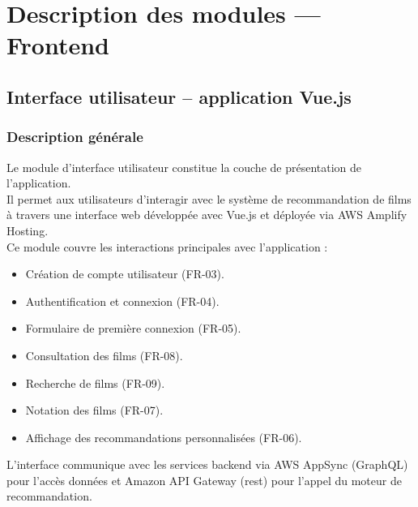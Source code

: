 \documentclass[a4paper,12pt]{report}
\begin{document}
\section{Description des modules — Frontend}

\subsection{Interface utilisateur – application Vue.js}
\label{vue}
\subsubsection{Description générale}
Le module d’interface utilisateur constitue la couche de présentation de l’application.\\ Il permet aux utilisateurs d’interagir avec le système de recommandation de films à travers une interface web développée avec Vue.js et déployée via AWS Amplify Hosting.\\
Ce module couvre les interactions principales avec l’application :

\begin{itemize}
    \item Création de compte utilisateur (FR-03).
    \item Authentification et connexion (FR-04).
    \item Formulaire de première connexion (FR-05).
    \item Consultation des films (FR-08). 
    \item Recherche de films (FR-09). 
    \item Notation des films (FR-07).
    \item Affichage des recommandations personnalisées (FR-06).

\end{itemize}
    L’interface communique avec les services backend via AWS AppSync (GraphQL) pour l’accès données et Amazon API Gateway (rest) pour l’appel du moteur de recommandation.
\end{document}
